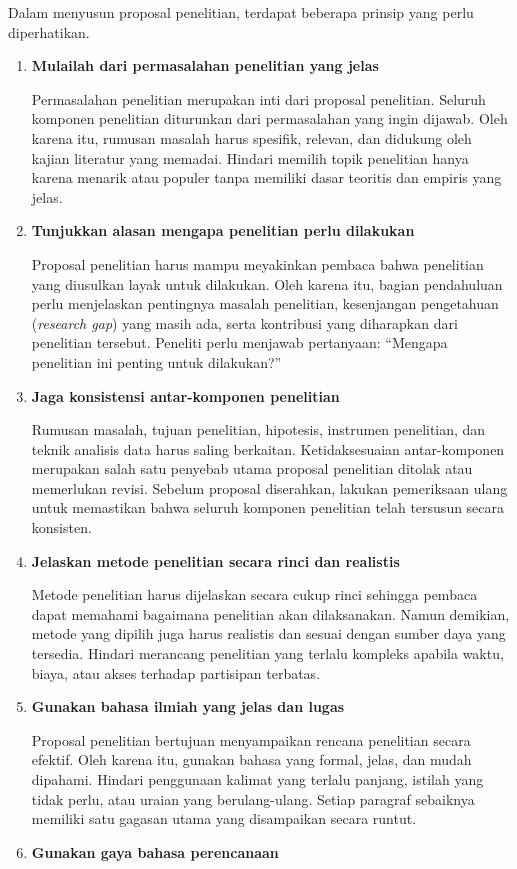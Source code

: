 \documentclass[
  indonesian,
  letterpaper,
  DIV=11,
  numbers=noendperiod]{scrreprt}
\begin{document}
Dalam menyusun proposal penelitian, terdapat beberapa prinsip yang perlu
diperhatikan.

\begin{enumerate}
\def\labelenumi{\arabic{enumi}.}
\item
  \textbf{Mulailah dari permasalahan penelitian yang jelas}

  Permasalahan penelitian merupakan inti dari proposal penelitian.
  Seluruh komponen penelitian diturunkan dari permasalahan yang ingin
  dijawab. Oleh karena itu, rumusan masalah harus spesifik, relevan, dan
  didukung oleh kajian literatur yang memadai. Hindari memilih topik
  penelitian hanya karena menarik atau populer tanpa memiliki dasar
  teoritis dan empiris yang jelas.
\item
  \textbf{Tunjukkan alasan mengapa penelitian perlu dilakukan}

  Proposal penelitian harus mampu meyakinkan pembaca bahwa penelitian
  yang diusulkan layak untuk dilakukan. Oleh karena itu, bagian
  pendahuluan perlu menjelaskan pentingnya masalah penelitian,
  kesenjangan pengetahuan (\emph{research gap}) yang masih ada, serta
  kontribusi yang diharapkan dari penelitian tersebut. Peneliti perlu
  menjawab pertanyaan: ``Mengapa penelitian ini penting untuk
  dilakukan?''
\item
  \textbf{Jaga konsistensi antar-komponen penelitian}

  Rumusan masalah, tujuan penelitian, hipotesis, instrumen penelitian,
  dan teknik analisis data harus saling berkaitan. Ketidaksesuaian
  antar-komponen merupakan salah satu penyebab utama proposal penelitian
  ditolak atau memerlukan revisi. Sebelum proposal diserahkan, lakukan
  pemeriksaan ulang untuk memastikan bahwa seluruh komponen penelitian
  telah tersusun secara konsisten.
\item
  \textbf{Jelaskan metode penelitian secara rinci dan realistis}

  Metode penelitian harus dijelaskan secara cukup rinci sehingga pembaca
  dapat memahami bagaimana penelitian akan dilaksanakan. Namun demikian,
  metode yang dipilih juga harus realistis dan sesuai dengan sumber daya
  yang tersedia. Hindari merancang penelitian yang terlalu kompleks
  apabila waktu, biaya, atau akses terhadap partisipan terbatas.
\item
  \textbf{Gunakan bahasa ilmiah yang jelas dan lugas}

  Proposal penelitian bertujuan menyampaikan rencana penelitian secara
  efektif. Oleh karena itu, gunakan bahasa yang formal, jelas, dan mudah
  dipahami. Hindari penggunaan kalimat yang terlalu panjang, istilah
  yang tidak perlu, atau uraian yang berulang-ulang. Setiap paragraf
  sebaiknya memiliki satu gagasan utama yang disampaikan secara runtut.
\item
  \textbf{Gunakan gaya bahasa perencanaan}


\end{enumerate}
\end{document}
